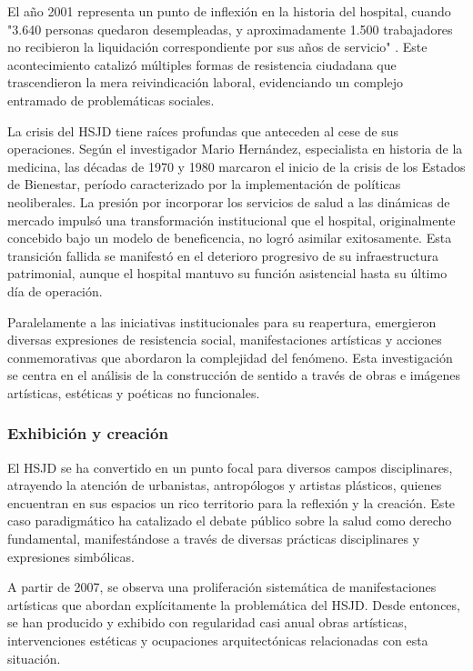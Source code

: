 El año 2001 representa un punto de inflexión en la historia del hospital, cuando "3.640 personas quedaron desempleadas, y aproximadamente 1.500 trabajadores no recibieron la liquidación correspondiente por sus años de servicio" \parencite{Castiblanco2017}. Este acontecimiento catalizó múltiples formas de resistencia ciudadana que trascendieron la mera reivindicación laboral, evidenciando un complejo entramado de problemáticas sociales.

La crisis del HSJD tiene raíces profundas que anteceden al cese de sus operaciones. Según el investigador Mario Hernández, especialista en historia de la medicina, las décadas de 1970 y 1980 marcaron el inicio de la crisis de los Estados de Bienestar, período caracterizado por la implementación de políticas neoliberales. La presión por incorporar los servicios de salud a las dinámicas de mercado impulsó una transformación institucional que el hospital, originalmente concebido bajo un modelo de beneficencia, no logró asimilar exitosamente. Esta transición fallida se manifestó en el deterioro progresivo de su infraestructura patrimonial, aunque el hospital mantuvo su función asistencial hasta su último día de operación.

Paralelamente a las iniciativas institucionales para su reapertura, emergieron diversas expresiones de resistencia social, manifestaciones artísticas y acciones conmemorativas que abordaron la complejidad del fenómeno. Esta investigación se centra en el análisis de la construcción de sentido a través de obras e imágenes artísticas, estéticas y poéticas no funcionales.

\subsubsection*{Exhibición y creación}

El HSJD se ha convertido en un punto focal para diversos campos disciplinares, atrayendo la atención de urbanistas, antropólogos y artistas plásticos, quienes encuentran en sus espacios un rico territorio para la reflexión y la creación. Este caso paradigmático ha catalizado el debate público sobre la salud como derecho fundamental, manifestándose a través de diversas prácticas disciplinares y expresiones simbólicas.

A partir de 2007, se observa una proliferación sistemática de manifestaciones artísticas que abordan explícitamente la problemática del HSJD. Desde entonces, se han producido y exhibido con regularidad casi anual obras artísticas, intervenciones estéticas y ocupaciones arquitectónicas relacionadas con esta situación.

